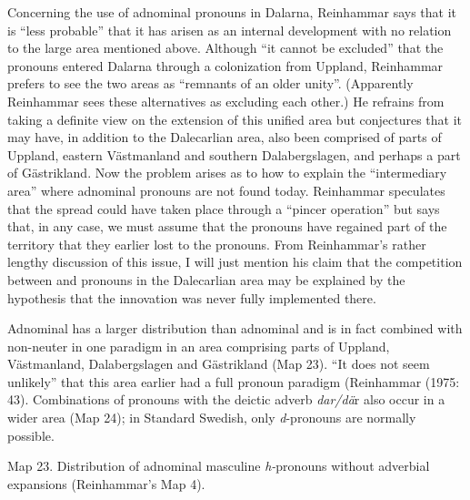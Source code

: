 Concerning the use of adnominal pronouns in Dalarna, Reinhammar says that it is “less probable” that it has arisen as an internal development with no relation to the large area mentioned above. Although “it cannot be excluded” that the pronouns entered Dalarna through a colonization from Uppland, Reinhammar prefers to see the two areas as “remnants of an older unity”. (Apparently Reinhammar sees these alternatives as excluding each other.) He refrains from taking a definite view on the extension of this unified area but conjectures that it may have, in addition to the Dalecarlian area, also been comprised of parts of Uppland, eastern Västmanland and southern Dalabergslagen, and perhaps a part of Gästrikland. Now the problem arises as to how to explain the “intermediary area” where adnominal pronouns are not found today. Reinhammar speculates that the spread could have taken place through a “pincer operation” but says that, in any case, we must assume that the pronouns have regained part of the territory that they earlier lost to the pronouns. From Reinhammar’s rather lengthy discussion of this issue, I will just mention his claim that the competition between  and pronouns in the Dalecarlian area may be explained by the hypothesis that the innovation was never fully implemented there. 

Adnominal has a larger distribution than adnominal and is in fact combined with non-neuter  in one paradigm in an area comprising parts of Uppland, Västmanland, Dalabergslagen and Gästrikland (Map 23). “It does not seem unlikely” that this area earlier had a full pronoun paradigm (Reinhammar (1975: 43). Combinations of pronouns with the deictic adverb \textit{dar/dä}r also occur in a wider area (Map 24); in Standard Swedish, only \textit{d}{}-pronouns are normally possible.   

\clearpage%
\label{bkm:Ref108601692}Map 23. Distribution of adnominal masculine \newline
\textit{h-}pronouns without adverbial expansions (Reinhammar’s Map 4).


